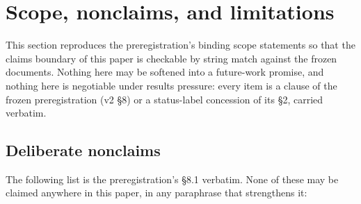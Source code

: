 \section{Scope, nonclaims, and limitations}
\label{sec:scope}

\begingroup\sloppy

This section reproduces the preregistration's binding scope statements so that
the claims boundary of this paper is checkable by string match against the
frozen documents. Nothing here may be softened into a future-work promise,
and nothing here is negotiable under results pressure: every item is a clause
of the frozen preregistration (v2 \S8) or a status-label concession of its
\S2, carried verbatim.

\subsection{Deliberate nonclaims}
\label{sec:scope-nonclaims}

The following list is the preregistration's \S8.1 verbatim. None of these may
be claimed anywhere in this paper, in any paraphrase that strengthens it:

